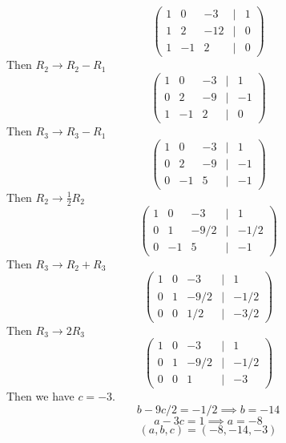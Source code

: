 \documentclass{article}
\begin{document}
\section{}
\subsection{}
\[\begin{pmatrix}
    1&0&-3&|&1 \\ 1&2&-12&|&0 \\ 1&-1&2&|&0
\end{pmatrix}\]
Then \(R_2 \rightarrow R_2 - R_1\)
\[\begin{pmatrix}
    1&0&-3&|&1 \\ 0&2&-9&|&-1 \\ 1&-1&2&|&0
\end{pmatrix}\]
Then \(R_3 \rightarrow R_3 - R_1\)
\[\begin{pmatrix}
    1&0&-3&|&1 \\ 0&2&-9&|&-1 \\ 0&-1&5&|&-1
\end{pmatrix}\]
Then \(R_2 \rightarrow \frac{1}{2}R_2\)
\[\begin{pmatrix}
    1&0&-3&|&1 \\ 0&1&-9/2&|&-1/2 \\ 0&-1&5&|&-1
\end{pmatrix}\]
Then \(R_3 \rightarrow R_2 + R_3\)
\[\begin{pmatrix}
    1&0&-3&|&1 \\ 0&1&-9/2&|&-1/2 \\ 0&0&1/2&|&-3/2
\end{pmatrix}\]
Then \(R_3\rightarrow2R_3\)
\[\begin{pmatrix}
    1&0&-3&|&1 \\ 0&1&-9/2&|&-1/2 \\ 0&0&1&|&-3
\end{pmatrix}\]
Then we have \(c = -3\). 
\[b-9c/2=-1/2 \implies b = -14\]
\[a-3c = 1 \implies a= -8\]
\[(a,b,c)= (-8,-14,-3)\]
\end{document}

